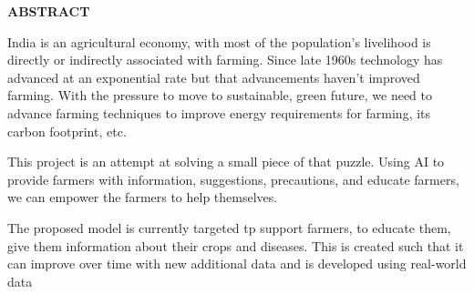 \documentclass[../Report.tex]{subfiles}
\begin{document}
\begin{center}
    \textbf{ABSTRACT}
\end{center}

India is an agricultural economy, with most of the population's livelihood is directly or indirectly associated with farming. Since late 
1960s technology has advanced at an exponential rate but that advancements haven't improved farming. With the pressure to move to
sustainable, green future, we need to advance farming techniques to improve energy requirements for farming, its carbon footprint, etc. \par

This project is an attempt at solving a small piece of that puzzle. Using AI to provide farmers with information, suggestions, precautions,
and educate farmers, we can empower the farmers to help themselves.\par

The proposed model is currently targeted tp support farmers, to educate them, give them information about their crops and diseases. This 
is created such that it can improve over time with new additional data and is developed using real-world data

\pagebreak
\end{document}
